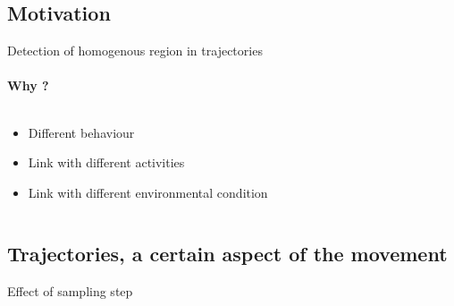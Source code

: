 
\subsection{Motivation}
\begin{frame}[fragile]{Detection of homogenous region in trajectories}

  \paragraph{Why ?}
\begin{columns}
\begin{column}{0.4\textwidth}
\begin{itemize}
\item Different behaviour
\item Link with different activities
\item Link with different environmental condition
\end{itemize}

\end{column}
\begin{column}{0.6\textwidth}



  
\end{column}
\end{columns}
\end{frame}



\subsection{Trajectories, a certain aspect of the movement}
\begin{frame}[fragile]{Effect of sampling step}


\end{frame}


